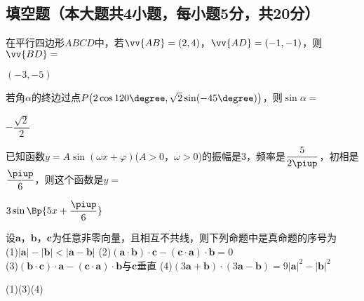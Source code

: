 \begin{exercise}
\section{填空题（本大题共4小题，每小题5分，共20分）}
  \item
     在平行四边形$ABCD$中，若$\vv{AB}=(2,4)$，$\vv{AD}=(-1,-1)$，则$\vv{BD}=$\tk
    \begin{answer}
      $(-3,-5)$
    \end{answer}
  \item
     若角$\alpha$的终边过点$P\bigl(2\cos{120\degree},\sqrt2\sin(-45\degree)\bigr)$，则$\sin\alpha=$\tk
     \begin{answer}
       $-\dfrac{\sqrt2}2$
     \end{answer}
  \item
     已知函数$y=A\sin(\omega x+\varphi)$($A>0$，$\omega>0$)的振幅是$3$，频率是$\dfrac5{2\piup}$，初相是$\dfrac{\piup}6$，则这个函数是$y=$\tk
    \begin{answer}
      $3\sin\Bp{5x+\dfrac{\piup}6}$
    \end{answer}
  \item
    设$\bm a$，$\bm b$，$\bm c$为任意非零向量，且相互不共线，则下列命题中是真命题的序号为\tk\\
    (1)$|\bm a|-|\bm b|<|\bm a-\bm b|$\hspace{4em}
    (2)$(\bm a\cdot\bm b)\cdot\bm c-(\bm c\cdot\bm a)\cdot\bm b=0$\\
    (3)$(\bm b\cdot\bm c)\cdot\bm a-(\bm c\cdot\bm a)\cdot\bm b$与$\bm c$垂直\hspace{2em}
    (4)$(3\bm a+\bm b)\cdot(3\bm a-\bm b)=9|\bm a|^2-|\bm b|^2$
    \begin{answer}
      (1)(3)(4)
    \end{answer}

\end{exercise}
